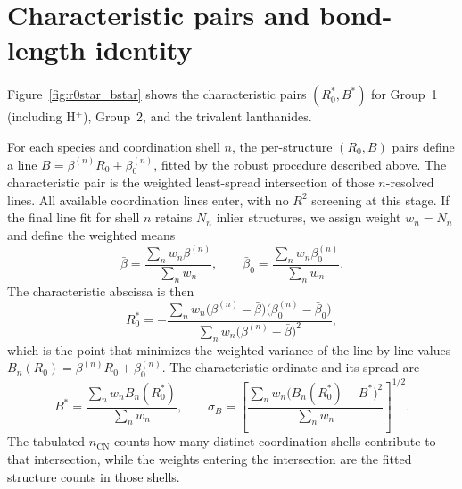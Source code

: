 \documentclass[aps,prmaterials,twocolumn,10pt,superscriptaddress,floatfix]{revtex4-2}
\begin{document}
\clearpage

\section{Characteristic pairs and bond-length identity}

Figure~\ref{fig:r0star_bstar} shows the characteristic pairs
$(R_0^*,B^*)$ for Group~1 (including H$^+$), Group~2, and the
trivalent lanthanides.

For each species and coordination shell $n$, the per-structure
$(R_0,B)$ pairs define a line $B=\beta^{(n)}R_0+\beta_0^{(n)}$, fitted
by the robust procedure described above.  The characteristic pair is
the weighted least-spread intersection of those $n$-resolved lines.
All available coordination lines enter, with no $R^2$ screening at
this stage.  If the final line fit for shell $n$ retains $N_n$ inlier
structures, we assign weight $w_n=N_n$ and define the weighted means
\[
\bar\beta=\frac{\sum_n w_n\beta^{(n)}}{\sum_n w_n},
\qquad
\bar\beta_0=\frac{\sum_n w_n\beta_0^{(n)}}{\sum_n w_n}.
\]
The characteristic abscissa is then
\[
R_0^*=
-\frac{\sum_n w_n\bigl(\beta^{(n)}-\bar\beta\bigr)
\bigl(\beta_0^{(n)}-\bar\beta_0\bigr)}
{\sum_n w_n\bigl(\beta^{(n)}-\bar\beta\bigr)^2},
\]
which is the point that minimizes the weighted variance of the
line-by-line values $B_n(R_0)=\beta^{(n)}R_0+\beta_0^{(n)}$.  The
characteristic ordinate and its spread are
\[
B^*=
\frac{\sum_n w_n B_n(R_0^*)}{\sum_n w_n},
\qquad
\sigma_B=
\left[
\frac{\sum_n w_n\bigl(B_n(R_0^*)-B^*\bigr)^2}
{\sum_n w_n}
\right]^{1/2}.
\]
The tabulated $n_{\mathrm{CN}}$ counts how many distinct coordination
shells contribute to that intersection, while the weights entering the
intersection are the fitted structure counts in those shells.
\end{document}
